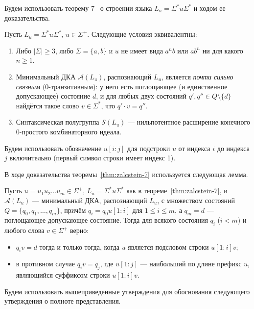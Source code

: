 \documentclass[fontsize=14pt]{scrartcl}
\begin{document}
Будем использовать теорему 7~\cite{Zalcstein1972} о строении языка $L_u = \Sigma^* u \Sigma^*$ и ходом ее доказательства.

\begin{Theorem}
\label{thm:zalcstein-7}
Пусть $L_u = \Sigma^* u \Sigma^*$, $u \in \Sigma^+$. Следующие условия эквивалентны:
\begin{enumerate}
    \item Либо $|\Sigma| \geq 3$, либо $\Sigma = \{a, b\}$ и $u$ не имеет вида $a^n b$ или $a b^n$ ни для какого $n \geq 1$.
    \item Минимальный ДКА $\mathcal{A}(L_u)$, распознающий $L_u$, является \emph{почти сильно связным} ($0$-транзитивным): у него есть поглощающее (и единственное допускающее) состояние $d$, и для любых двух состояний $q', q'' \in Q \setminus \{d\}$ найдётся такое слово $v \in \Sigma^*$, что $q' \cdot v = q''$.
    \item Синтаксическая полугруппа $\mathcal{S}(L_u)$ --- нильпотентное расширение конечного $0$-простого комбинаторного идеала.
\end{enumerate}
\end{Theorem}

Будем использовать обозначение $u[i:j]$ для подстроки $u$ от индекса $i$ до индекса $j$ включительно (первый символ строки имеет индекс 1).

В ходе доказательства теоремы~\ref{thm:zalcstein-7} используется следующая лемма.

\begin{Lemma}
\label{lem:zalcstein-2}
Пусть $u = u_1 u_2 \ldots u_m \in \Sigma^+$, $L_u = \Sigma^* u \Sigma^*$ как в теореме~\ref{thm:zalcstein-7}, и $\mathcal{A}(L_u)$ --- минимальный ДКА, 
распознающий $L_u$, с множеством состояний $Q = \{q_0, q_1, \ldots, q_m\}$, 
причём $q_i = q_0 u[1:i]$ для $1 \leq i \leq m$, а $q_m = d$ --- 
поглощающее допускающее состояние. Тогда для всякого состояния $q_i$ ($i < m$) и
 любого слова $v \in \Sigma^+$ верно:
\begin{itemize}
    \item $q_i v = d$ тогда и только тогда, когда $u$ является подсловом строки $u[1:i] v$;
    \item в противном случае $q_i  v = q_j$, где $u[1:j]$ --- наибольший по длине префикс $u$, являющийся суффиксом строки $u[1:i] v$.
\end{itemize}
\end{Lemma}

Будем использовать вышеприведенные утверждения для обоснования следующего утверждения о полноте представления.
\end{document}
